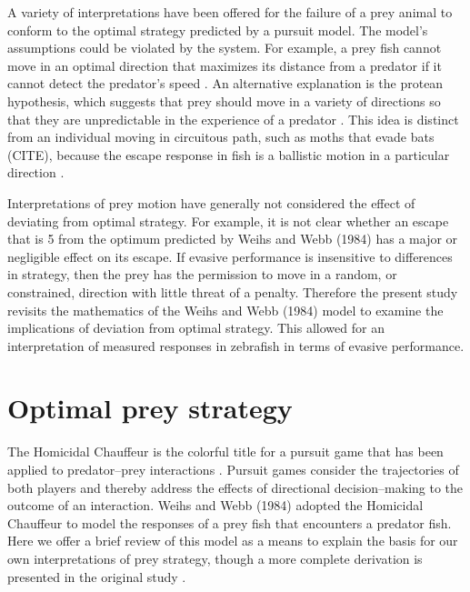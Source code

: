 \documentclass[12pt]{article}
\begin{document}
A variety of interpretations have been offered for the failure of a prey animal to conform to the optimal strategy predicted by a pursuit model. The model's assumptions could be violated by the system. For example, a prey fish cannot move in an optimal direction that maximizes its distance from a predator if it cannot detect the predator's speed \citep{Weihs:1984tb}. An alternative explanation is the protean hypothesis, which suggests that prey should move in a variety of directions so that they are unpredictable in the experience of a predator \citep{Domenici:2011tv, Humphries:1970hy}. This idea is distinct from an individual moving in circuitous path, such as moths that evade bats (CITE), because the escape response in fish is a ballistic motion in a particular direction \citep{D:1973up}. 

Interpretations of prey motion have generally not considered the effect of deviating from optimal strategy. For example, it is not clear whether an escape that is 5\textdegree\hspace{0.5pt} from the optimum predicted by Weihs and Webb (1984) has a major or negligible effect on its escape. If evasive performance is insensitive to differences in strategy, then the prey has the permission to move in a random, or constrained, direction with little threat of a penalty. Therefore the present study revisits the mathematics of the Weihs and Webb (1984) model to examine the implications of deviation from optimal strategy. This allowed for an interpretation of measured responses in zebrafish in terms of evasive performance.

\section{Optimal prey strategy}
\label{opt_strategy}

The Homicidal Chauffeur is the colorful title for a pursuit game that has been applied to predator--prey interactions \citep{Isaacs:1965va}. Pursuit games consider the trajectories of both players and thereby address the effects of directional decision--making to the outcome of an interaction. Weihs and Webb (1984) adopted the Homicidal Chauffeur to model the responses of a prey fish that encounters a predator fish. Here we offer a brief review of this model as a means to explain the basis for our own interpretations of prey strategy, though a more complete derivation is presented in the original study \citep{Weihs:1984tb}.
\end{document}
